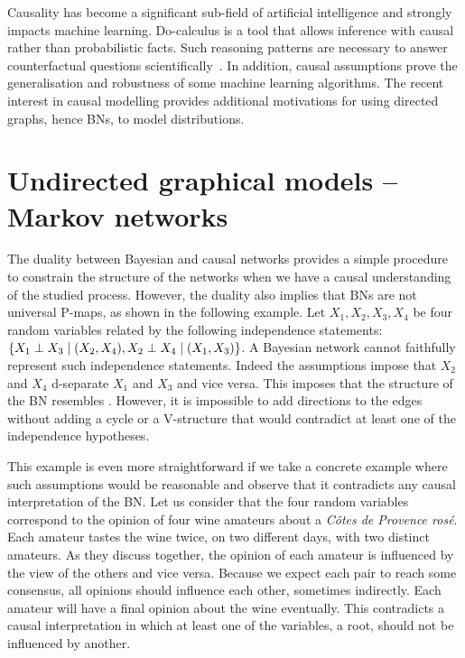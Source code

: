 Causality has become a significant sub-field of artificial intelligence and strongly impacts machine learning. Do-calculus \citep{pearl1994probabilistic} is a tool that allows inference with causal rather than probabilistic facts. Such reasoning patterns are necessary to answer counterfactual questions scientifically~\citep{morgan2015counterfactuals}. In addition, causal assumptions prove the generalisation and robustness of some machine learning algorithms. The recent interest in causal modelling provides additional motivations for using directed graphs, hence BNs, to model distributions.
\section{Undirected graphical models -- Markov networks}
The duality between Bayesian and causal networks provides a simple procedure to constrain the structure of the networks when we have a causal understanding of the studied process. However, the duality also implies that BNs are not universal P-maps, as shown in the following example. Let $X_1, X_2, X_3, X_4$ be four random variables related by the following independence statements: $\{ X_1 \perp X_3 \mid (X_2, X_4), X_2 \perp X_4 \mid (X_1, X_3)\}$. A Bayesian network cannot faithfully represent such independence statements. Indeed the assumptions impose that $X_2$ and $X_4$ d-separate $X_1$ and $X_3$ and vice versa. This imposes that the structure of the BN resembles . However, it is impossible to add directions to the edges without adding a cycle or a V-structure that would contradict at least one of the independence hypotheses.

This example is even more straightforward if we take a concrete example where such assumptions would be reasonable and observe that it contradicts any causal interpretation of the BN. Let us consider that the four random variables correspond to the opinion of four wine amateurs about a \textit{C{\^o}tes de Provence ros{\'e}}. Each amateur tastes the wine twice, on two different days, with two distinct amateurs. As they discuss together, the opinion of each amateur is influenced by the view of the others and vice versa. Because we expect each pair to reach some consensus, all opinions should influence each other, sometimes indirectly.  Each amateur will have a final opinion about the wine eventually. This contradicts a causal interpretation in which at least one of the variables, a root, should not be influenced by another.

